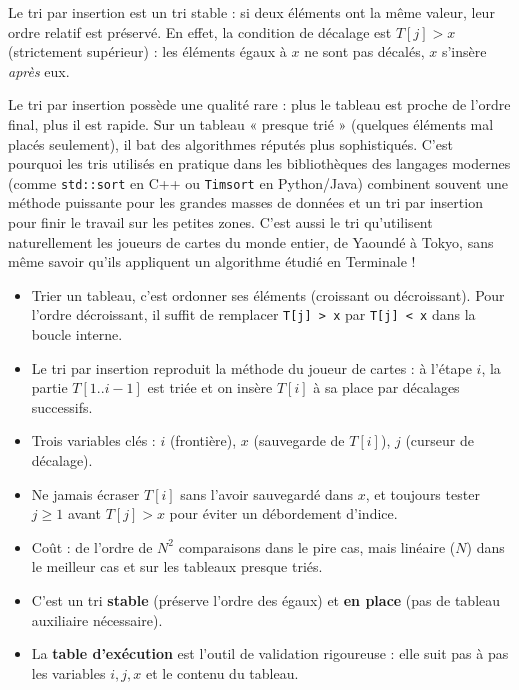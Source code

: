 \documentclass[11pt]{article}
\newcommand{\cle}[1]{{\popxbold\color{popdark}#1}}
\begin{document}
\begin{propriete}[Stabilité]
Le tri par insertion est un tri \cle{stable} : si deux éléments ont la même valeur, leur ordre relatif est préservé. En effet, la condition de décalage est $T[j] > x$ (strictement supérieur) : les éléments égaux à $x$ ne sont pas décalés, $x$ s'insère \emph{après} eux.
\end{propriete}

\begin{savaistu}
Le tri par insertion possède une qualité rare : plus le tableau est proche de l'ordre final, plus il est rapide. Sur un tableau « presque trié » (quelques éléments mal placés seulement), il bat des algorithmes réputés plus sophistiqués. C'est pourquoi les tris utilisés en pratique dans les bibliothèques des langages modernes (comme \texttt{std::sort} en C++ ou \texttt{Timsort} en Python/Java) combinent souvent une méthode puissante pour les grandes masses de données et un tri par insertion pour finir le travail sur les petites zones. C'est aussi le tri qu'utilisent naturellement les joueurs de cartes du monde entier, de Yaoundé à Tokyo, sans même savoir qu'ils appliquent un algorithme étudié en Terminale !
\end{savaistu}

\begin{aretenir}
\begin{itemize}
\item Trier un tableau, c'est ordonner ses éléments (croissant ou décroissant). Pour l'ordre décroissant, il suffit de remplacer \texttt{T[j] > x} par \texttt{T[j] < x} dans la boucle interne.
\item Le tri par insertion reproduit la méthode du joueur de cartes : à l'étape $i$, la partie $T[1..i-1]$ est triée et on insère $T[i]$ à sa place par décalages successifs.
\item Trois variables clés : $i$ (frontière), $x$ (sauvegarde de $T[i]$), $j$ (curseur de décalage).
\item Ne jamais écraser $T[i]$ sans l'avoir sauvegardé dans $x$, et toujours tester $j \ge 1$ avant $T[j] > x$ pour éviter un débordement d'indice.
\item Coût : de l'ordre de $N^2$ comparaisons dans le pire cas, mais linéaire ($N$) dans le meilleur cas et sur les tableaux presque triés.
\item C'est un tri \textbf{stable} (préserve l'ordre des égaux) et \textbf{en place} (pas de tableau auxiliaire nécessaire).
\item La \textbf{table d'exécution} est l'outil de validation rigoureuse : elle suit pas à pas les variables $i, j, x$ et le contenu du tableau.
\end{itemize}
\end{aretenir}
\end{document}
